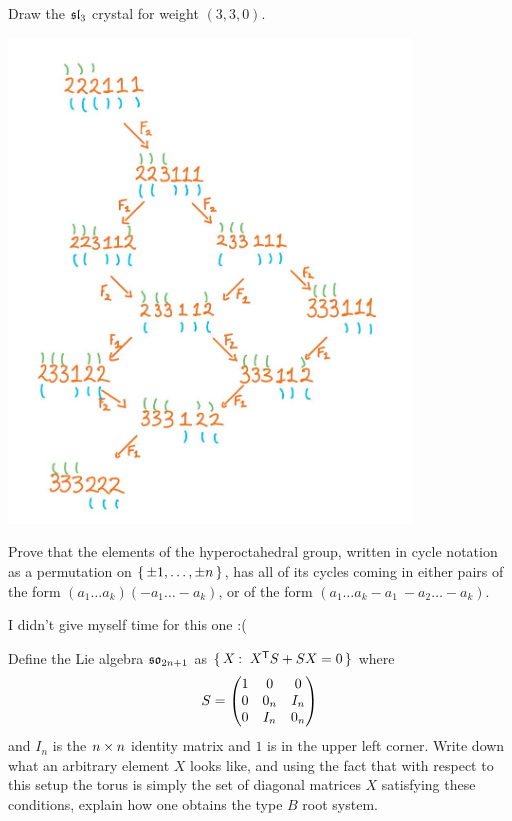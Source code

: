 \documentclass[12pt]{memoir}
\begin{document}
\begin{Ej}
Draw the $\mathfrak{sl}_3$ crystal for weight $(3,3,0)$.
\end{Ej}

\begin{ptcbr}
    \centering
    \includegraphics[width=0.8\textwidth]{fig1}
\end{ptcbr}
\begin{Ej}
    Prove that the elements of the hyperoctahedral group, written in cycle notation as a permutation on $\{\,\pm1,\dots , \pm n\,\}$, has all of its cycles coming in either pairs of the form $(a_1\dots a_k)(-a_1\dots -a_k)$, or of the form $(a_1\dots a_k -a_1\ -a_2\dots-a_k)$.
\end{Ej}

I didn't give myself time for this one :(

\begin{Ej}
    Define the Lie algebra $\mathfrak{so}_{2n+1}$ as $\{\,X\mathbin{:}\ X^{\mathsf{T}} S+SX=0\,\}$ where 
    $$S=\begin{pmatrix} 1 & 0 & 0 \\ 0 & 0_n & I_n \\ 0 & I_n & 0_n \end{pmatrix}$$
    and $I_n$ is the $n\times n$ identity matrix and $1$ is in the upper left corner. Write down what an arbitrary element $X$ looks like, and using the fact that with respect to this setup the torus is simply the set of diagonal matrices $X$ satisfying these conditions, explain how one obtains the type $B$ root system.
\end{Ej}
\end{document}
